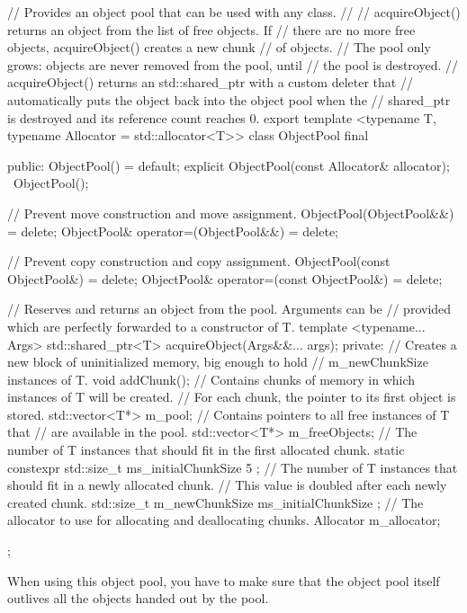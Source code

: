 \begin{cpp}
// Provides an object pool that can be used with any class.
//
// acquireObject() returns an object from the list of free objects. If
// there are no more free objects, acquireObject() creates a new chunk
// of objects.
// The pool only grows: objects are never removed from the pool, until
// the pool is destroyed.
// acquireObject() returns an std::shared_ptr with a custom deleter that
// automatically puts the object back into the object pool when the
// shared_ptr is destroyed and its reference count reaches 0.
export
template <typename T, typename Allocator = std::allocator<T>>
class ObjectPool final
{
    public:
        ObjectPool() = default;
        explicit ObjectPool(const Allocator& allocator);
        ~ObjectPool();

        // Prevent move construction and move assignment.
        ObjectPool(ObjectPool&&) = delete;
        ObjectPool& operator=(ObjectPool&&) = delete;

        // Prevent copy construction and copy assignment.
        ObjectPool(const ObjectPool&) = delete;
        ObjectPool& operator=(const ObjectPool&) = delete;

        // Reserves and returns an object from the pool. Arguments can be
        // provided which are perfectly forwarded to a constructor of T.
        template <typename... Args>
        std::shared_ptr<T> acquireObject(Args&&... args);
    private:
        // Creates a new block of uninitialized memory, big enough to hold
        // m_newChunkSize instances of T.
        void addChunk();
        // Contains chunks of memory in which instances of T will be created.
        // For each chunk, the pointer to its first object is stored.
        std::vector<T*> m_pool;
        // Contains pointers to all free instances of T that
        // are available in the pool.
        std::vector<T*> m_freeObjects;
        // The number of T instances that should fit in the first allocated chunk.
        static constexpr std::size_t ms_initialChunkSize { 5 };
        // The number of T instances that should fit in a newly allocated chunk.
        // This value is doubled after each newly created chunk.
        std::size_t m_newChunkSize { ms_initialChunkSize };
        // The allocator to use for allocating and deallocating chunks.
        Allocator m_allocator;
};
\end{cpp}

When using this object pool, you have to make sure that the object pool itself outlives all the objects handed out by the pool.


